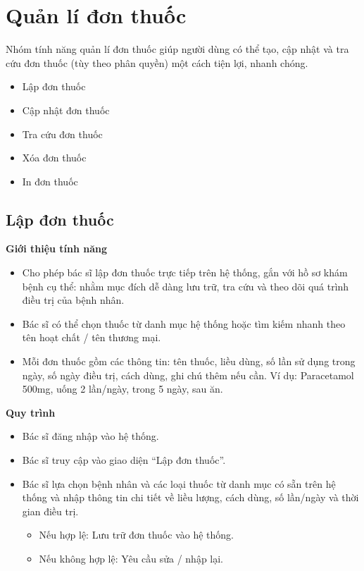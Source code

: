 \section{Quản lí đơn thuốc}

Nhóm tính năng quản lí đơn thuốc giúp người dùng có thể tạo, cập nhật và tra cứu đơn thuốc (tùy theo phân quyền) một cách tiện lợi, nhanh chóng.
\begin{itemize}
    \item Lập đơn thuốc
    \item Cập nhật đơn thuốc
    \item Tra cứu đơn thuốc
    \item Xóa đơn thuốc
    \item In đơn thuốc
\end{itemize}

\subsection{Lập đơn thuốc}

\noindent \textbf{Giới thiệu tính năng}
\begin{itemize}
    \item Cho phép bác sĩ lập đơn thuốc trực tiếp trên hệ thống, gắn với hồ sơ khám bệnh cụ thể: nhằm mục đích dễ dàng lưu trữ, tra cứu và theo dõi quá trình điều trị của bệnh nhân.
    \item Bác sĩ có thể chọn thuốc từ danh mục hệ thống hoặc tìm kiếm nhanh theo tên hoạt chất / tên thương mại.
    \item Mỗi đơn thuốc gồm các thông tin: tên thuốc, liều dùng, số lần sử dụng trong ngày, số ngày điều trị, cách dùng, ghi chú thêm nếu cần. Ví dụ: Paracetamol 500mg, uống 2 lần/ngày, trong 5 ngày, sau ăn.
\end{itemize}

\noindent \textbf{Quy trình}
\begin{itemize}
    \item Bác sĩ đăng nhập vào hệ thống.
    \item Bác sĩ truy cập vào giao diện ``Lập đơn thuốc''.
    \item Bác sĩ lựa chọn bệnh nhân và các loại thuốc từ danh mục có sẵn trên hệ thống và nhập thông tin chi tiết về liều lượng, cách dùng, số lần/ngày và thời gian điều trị.
    \begin{itemize}
        \item Nếu hợp lệ: Lưu trữ đơn thuốc vào hệ thống.
        \item Nếu không hợp lệ: Yêu cầu sửa / nhập lại.
    \end{itemize}
\end{itemize}

